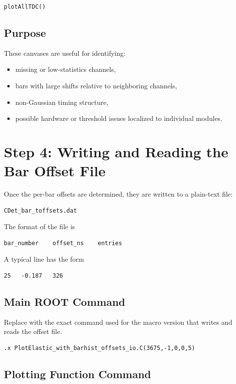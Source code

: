 \documentclass[11pt]{article}
\begin{document}
\begin{lstlisting}
plotAllTDC()
\end{lstlisting}

\subsection{Purpose}

These canvases are useful for identifying:
\begin{itemize}
    \item missing or low-statistics channels,
    \item bars with large shifts relative to neighboring channels,
    \item non-Gaussian timing structure,
    \item possible hardware or threshold issues localized to individual modules.
\end{itemize}

\section{Step 4: Writing and Reading the Bar Offset File}

Once the per-bar offsets are determined, they are written to a plain-text file:
\begin{lstlisting}
CDet_bar_toffsets.dat
\end{lstlisting}

The format of the file is
\begin{lstlisting}
bar_number    offset_ns    entries
\end{lstlisting}

A typical line has the form
\begin{lstlisting}
25   -0.187   326
\end{lstlisting}

\subsection{Main ROOT Command}

Replace with the exact command used for the macro version that writes and reads the offset file.

\begin{lstlisting}
.x PlotElastic_with_barhist_offsets_io.C(3675,-1,0,0,5)
\end{lstlisting}

\subsection{Plotting Function Command}
\end{document}
